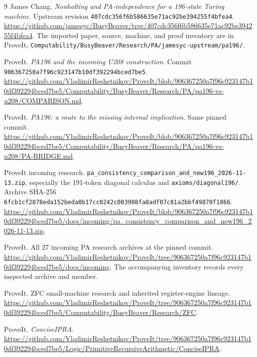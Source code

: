 \documentclass[11pt,letterpaper]{article}
\newcommand{\file}[1]{\texttt{\nolinkurl{#1}}}
\begin{document}
\clearpage
\begin{thebibliography}{9}
James Chang.
\emph{Nonhalting and PA-independence for a 196-state Turing machine}.
Upstream revision \file{407cdc356f6b586635e71ac92be394255f4bfea4}.
\url{https://github.com/jamesyc/BusyBeaver/tree/407cdc356f6b586635e71ac92be394255f4bfea4}.
The imported paper, source, machine, and proof inventory are in ProveIt,
\file{Computability/BusyBeaver/Research/PA/jamesyc-upstream/pa196/}.

ProveIt. \emph{PA196 and the incoming U208 construction}.
Commit \file{906367250a7f96c923147b10df392294bced7be5}.
\url{https://github.com/VladimirReshetnikov/ProveIt/blob/906367250a7f96c923147b10df392294bced7be5/Computability/BusyBeaver/Research/PA/pa196-vs-u208/COMPARISON.md}.

ProveIt. \emph{PA196: a route to the missing internal implication}.
Same pinned commit.
\url{https://github.com/VladimirReshetnikov/ProveIt/blob/906367250a7f96c923147b10df392294bced7be5/Computability/BusyBeaver/Research/PA/pa196-vs-u208/PA-BRIDGE.md}.

ProveIt incoming research.
\file{pa_consistency_comparison_and_new196_2026-11-13.zip},
especially the 191-token diagonal calculus and \file{axioms/diagonal196/}.
Archive SHA-256
\nolinkurl{6fcb1cf2878eda152beda0b17cc0242c003908fa8adf07c81a2bbf49870f1866}.
\url{https://github.com/VladimirReshetnikov/ProveIt/blob/906367250a7f96c923147b10df392294bced7be5/docs/incoming/pa_consistency_comparison_and_new196_2026-11-13.zip}.

ProveIt. All 27 incoming PA research archives at the pinned commit.
\url{https://github.com/VladimirReshetnikov/ProveIt/tree/906367250a7f96c923147b10df392294bced7be5/docs/incoming}.
The accompanying inventory records every inspected archive and member.

ProveIt. ZFC small-machine research and inherited register-engine lineage.
\url{https://github.com/VladimirReshetnikov/ProveIt/tree/906367250a7f96c923147b10df392294bced7be5/Computability/BusyBeaver/Research/ZFC}.

ProveIt. \emph{ConciseIPRA}.
\url{https://github.com/VladimirReshetnikov/ProveIt/tree/906367250a7f96c923147b10df392294bced7be5/Logic/PrimitiveRecursiveArithmetic/ConciseIPRA}.
\end{thebibliography}
\end{document}
